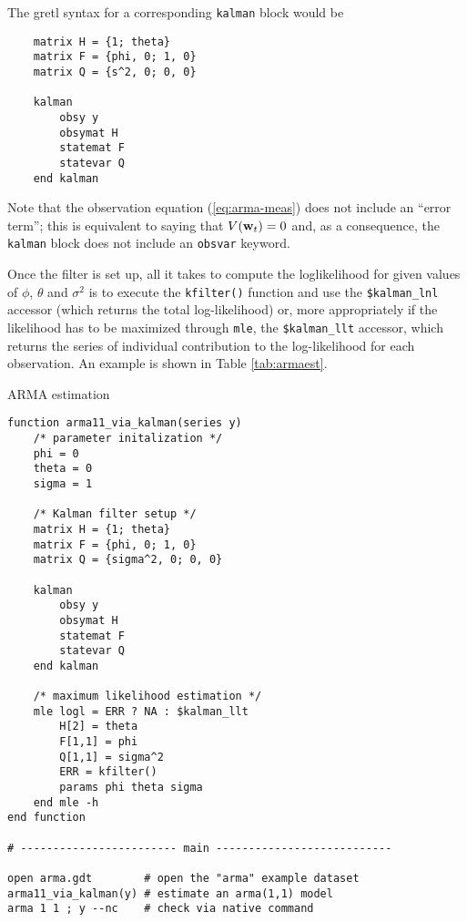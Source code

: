 \documentclass[a4paper]{article}
\newcommand{\obsdist}{\ensuremath\mathbf{w}}
\begin{document}
The gretl syntax for a corresponding \texttt{kalman} block would be
\begin{verbatim}
    matrix H = {1; theta}
    matrix F = {phi, 0; 1, 0}
    matrix Q = {s^2, 0; 0, 0}

    kalman
        obsy y
        obsymat H
        statemat F
        statevar Q
    end kalman
\end{verbatim}
Note that the observation equation (\ref{eq:arma-meas}) does not
include an ``error term''; this is equivalent to saying that
$V(\obsdist_t) = 0$ and, as a consequence, the \texttt{kalman} block
does not include an \texttt{obsvar} keyword.

Once the filter is set up, all it takes to compute the loglikelihood
for given values of $\phi$, $\theta$ and $\sigma^2$ is to execute the
\texttt{kfilter()} function and use the \verb+$kalman_lnl+ accessor
(which returns the total log-likelihood) or, more appropriately if the
likelihood has to be maximized through \texttt{mle}, the
\verb+$kalman_llt+ accessor, which returns the series of individual
contribution to the log-likelihood for each observation. An example
is shown in Table \ref{tab:armaest}.

\begin{table}[htbp]
  \caption{ARMA estimation}
  \label{tab:armaest}

\begin{small}
\begin{verbatim}
function arma11_via_kalman(series y)
    /* parameter initalization */
    phi = 0
    theta = 0
    sigma = 1

    /* Kalman filter setup */
    matrix H = {1; theta}
    matrix F = {phi, 0; 1, 0}
    matrix Q = {sigma^2, 0; 0, 0}

    kalman
        obsy y
        obsymat H
        statemat F
        statevar Q
    end kalman

    /* maximum likelihood estimation */
    mle logl = ERR ? NA : $kalman_llt
        H[2] = theta
        F[1,1] = phi
        Q[1,1] = sigma^2
        ERR = kfilter()
        params phi theta sigma
    end mle -h
end function

# ------------------------ main ---------------------------

open arma.gdt        # open the "arma" example dataset
arma11_via_kalman(y) # estimate an arma(1,1) model
arma 1 1 ; y --nc    # check via native command
\end{verbatim}
\end{small}
\end{table}
\end{document}
